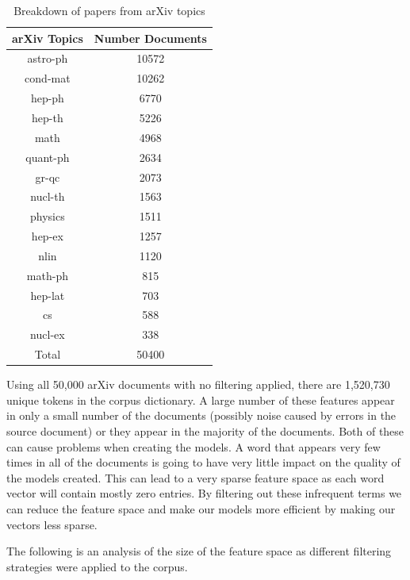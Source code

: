 \begin{table}[h]
    \centering
    \begin{tabular}{|c c|}
         \hline
         arXiv Topics & Number Documents \\ [0.5ex]
         \hline\hline
         astro-ph & 10572 \\
         cond-mat & 10262 \\
         hep-ph & 6770 \\
         hep-th & 5226 \\
         math & 4968 \\
         quant-ph & 2634 \\
         gr-qc & 2073 \\
         nucl-th & 1563 \\
         physics & 1511 \\
         hep-ex & 1257 \\
         nlin & 1120 \\
         math-ph & 815 \\
         hep-lat & 703 \\
         cs & 588 \\
         nucl-ex & 338 \\ [0.5ex]
         \hline\hline
         Total & 50400\\ [1ex]
         \hline
    \end{tabular}
    \caption{Breakdown of papers from arXiv topics}
    \label{table:arxivBreakdown}
\end{table}

Using all 50,000 arXiv documents with no filtering applied, there are 1,520,730 unique tokens in the corpus dictionary.
A large number of these features appear in only a small number of the documents (possibly noise caused by errors in the source document) or they appear in the majority of the documents.
Both of these can cause problems when creating the models.
A word that appears very few times in all of the documents is going to have very little impact on the quality of the models created.
This can lead to a very sparse feature space as each word vector will contain mostly zero entries.
By filtering out these infrequent terms we can reduce the feature space and make our models more efficient by making our vectors less sparse.

The following is an analysis of the size of the feature space as different filtering strategies were applied to the corpus.

